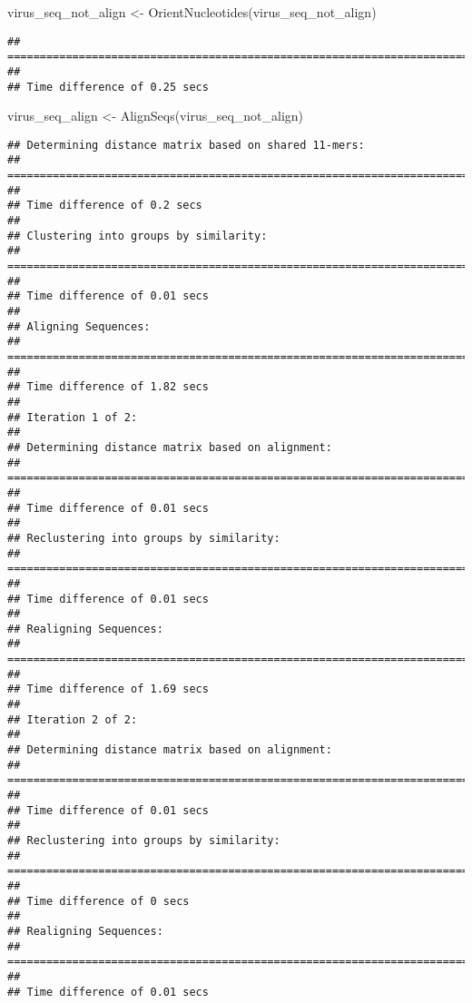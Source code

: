 \documentclass[
]{article}
\newenvironment{Shaded}{\begin{snugshade}}{\end{snugshade}}
\newcommand{\FunctionTok}[1]{\textcolor[rgb]{0.00,0.00,0.00}{#1}}
\newcommand{\NormalTok}[1]{#1}
\newcommand{\OtherTok}[1]{\textcolor[rgb]{0.56,0.35,0.01}{#1}}
\begin{document}
\begin{Shaded}
\begin{Highlighting}[]
\NormalTok{virus\_seq\_not\_align }\OtherTok{\textless{}{-}} \FunctionTok{OrientNucleotides}\NormalTok{(virus\_seq\_not\_align)}
\end{Highlighting}
\end{Shaded}

\begin{verbatim}
## ========================================================================================================================================================================================================
## 
## Time difference of 0.25 secs
\end{verbatim}

\begin{Shaded}
\begin{Highlighting}[]
\NormalTok{virus\_seq\_align }\OtherTok{\textless{}{-}} \FunctionTok{AlignSeqs}\NormalTok{(virus\_seq\_not\_align)}
\end{Highlighting}
\end{Shaded}

\begin{verbatim}
## Determining distance matrix based on shared 11-mers:
## ================================================================================
## 
## Time difference of 0.2 secs
## 
## Clustering into groups by similarity:
## ================================================================================
## 
## Time difference of 0.01 secs
## 
## Aligning Sequences:
## ================================================================================
## 
## Time difference of 1.82 secs
## 
## Iteration 1 of 2:
## 
## Determining distance matrix based on alignment:
## ================================================================================
## 
## Time difference of 0.01 secs
## 
## Reclustering into groups by similarity:
## ================================================================================
## 
## Time difference of 0.01 secs
## 
## Realigning Sequences:
## ================================================================================
## 
## Time difference of 1.69 secs
## 
## Iteration 2 of 2:
## 
## Determining distance matrix based on alignment:
## ================================================================================
## 
## Time difference of 0.01 secs
## 
## Reclustering into groups by similarity:
## ================================================================================
## 
## Time difference of 0 secs
## 
## Realigning Sequences:
## ================================================================================
## 
## Time difference of 0.01 secs
\end{verbatim}
\end{document}
